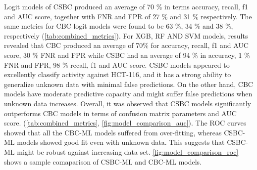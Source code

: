 Logit models of CSBC produced an average of 70 \% in terms accuracy, recall, f1 and AUC score, together with FNR and FPR of 27 \% and 31 \% respectively. The same metrics for CBC logit models were found to be 63 \%, 34 \% and 38 \%, respectively (\autoref{tab:combined_metrics}). For XGB, RF AND SVM models, results revealed that CBC produced an average of 70\% for accuracy, recall, f1 and AUC score, 30 \% FNR and FPR while CSBC had an average of 94 \% in accuracy, 1 \% FNR and FPR, 98 \% recall, f1 and AUC score. CSBC models appeared to excellently classify activity against HCT-116, and it has a strong ability to generalize unknown data with minimal false predictions. On the other hand, CBC models have moderate predictive capacity and might suffer false predictions when unknown data increases. Overall, it was observed that CSBC models significantly outperforms CBC models in terms of confusion matrix parameters and AUC score. (\autoref{tab:combined_metrics}, \autoref{fig:model_comparison_auc}). The ROC curves showed that all the CBC-ML models suffered from over-fitting, whereas CSBC-ML models showed good fit even with unknown data. This suggests that CSBC-ML might be robust against increasing data set. \autoref{fig:model_comparison_roc} shows a sample comaparison of CSBC-ML and CBC-ML models. 


